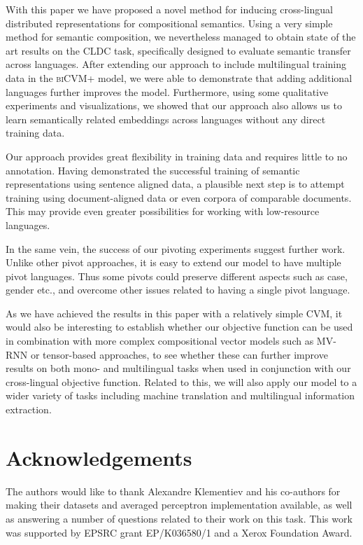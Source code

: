\documentclass{article} \pdfoutput=1
\newcommand{\biCVMplus}{\textsc{biCVM+}\xspace}
\newcommand{\CVM}{\textsc{CVM}\xspace}
\begin{document}
With this paper we have proposed a novel method for inducing cross-lingual
distributed representations for compositional semantics.  Using a very simple
method for semantic composition, we nevertheless managed to obtain state of the
art results on the CLDC task, specifically designed to evaluate semantic
transfer across languages.  After extending our approach to include multilingual
training data in the \biCVMplus model, we were able to demonstrate that adding
additional languages further improves the model.  Furthermore, using some
qualitative experiments and visualizations, we showed that our approach also
allows us to learn semantically related embeddings across languages without any
direct training data.

Our approach provides great flexibility in training data and requires little to
no annotation.  Having demonstrated the successful training of semantic
representations using sentence aligned data, a plausible next step is to attempt
training using document-aligned data or even corpora of comparable documents.
This may provide even greater possibilities for working with low-resource
languages.

In the same vein, the success of our pivoting experiments suggest further work.
Unlike other pivot approaches, it is easy to extend our model to have multiple
pivot languages.  Thus some pivots could preserve different aspects such as
case, gender etc., and overcome other issues related to having a single pivot
language.

As we have achieved the results in this paper with a relatively simple \CVM, it
would also be interesting to establish whether our objective function can be
used in combination with more complex compositional vector
models such as MV-RNN \cite{Socher:2012} or tensor-based approaches, to see
whether these can further improve results on both mono- and multilingual tasks
when used in conjunction with our cross-lingual objective function.  Related to
this, we will also apply our model to a wider variety of tasks including machine
translation and multilingual information extraction.

\section*{Acknowledgements}

The authors would like to thank Alexandre Klementiev and his co-authors for
making their datasets and averaged perceptron implementation available, as well
as answering a number of questions related to their work on this task.
This work was supported by EPSRC grant EP/K036580/1 and a Xerox Foundation
Award.
 


\end{document}
